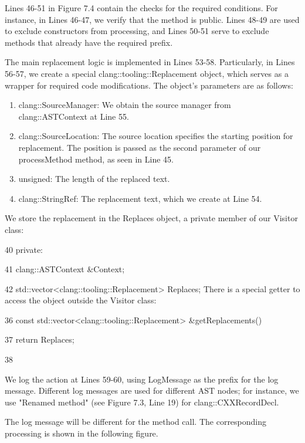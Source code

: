 Lines 46-51 in Figure 7.4 contain the checks for the required conditions. For instance, in Lines 46-47, we verify that the method is public. Lines 48-49 are used to exclude constructors from processing, and Lines 50-51 serve to exclude methods that already have the required prefix.

The main replacement logic is implemented in Lines 53-58. Particularly, in Lines 56-57, we create a special clang::tooling::Replacement object, which serves as a wrapper for required code modifications. The object's parameters are as follows:

\begin{enumerate}
\item
clang::SourceManager: We obtain the source manager from clang::ASTContext at Line 55.

\item
clang::SourceLocation: The source location specifies the starting position for replacement. The position is passed as the second parameter of our processMethod method, as seen in Line 45.

\item
unsigned: The length of the replaced text.

\item
clang::StringRef: The replacement text, which we create at Line 54.
\end{enumerate}

We store the replacement in the Replaces object, a private member of our Visitor class:

\begin{cpp}
40 private:

41   clang::ASTContext &Context;


42   std::vector<clang::tooling::Replacement> Replaces;
There is a special getter to access the object outside the Visitor class:

36   const std::vector<clang::tooling::Replacement> &getReplacements() {


37     return Replaces;

38   }
\end{cpp}

We log the action at Lines 59-60, using LogMessage as the prefix for the log message. Different log messages are used for different AST nodes; for instance, we use "Renamed method" (see Figure 7.3, Line 19) for clang::CXXRecordDecl.

The log message will be different for the method call. The corresponding processing is shown in the following figure.

